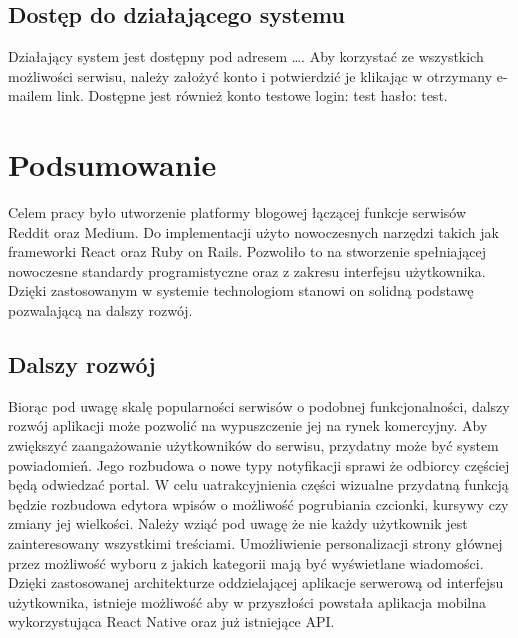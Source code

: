 \documentclass[declaration,shortabstract]{iithesis}
\begin{document}
\section{Dostęp do działającego systemu}
Działający system jest dostępny pod adresem \ldots. Aby korzystać ze wszystkich możliwości serwisu, należy założyć konto i potwierdzić je klikając w otrzymany e-mailem link. Dostępne jest również konto testowe login: test hasło: test.
{\color{red}
\chapter{Podsumowanie}
Celem pracy było utworzenie platformy blogowej łączącej funkcje serwisów Reddit oraz Medium. Do implementacji użyto nowoczesnych narzędzi takich jak frameworki React oraz Ruby on Rails. Pozwoliło to na stworzenie spełniającej nowoczesne standardy programistyczne oraz z zakresu interfejsu użytkownika. Dzięki zastosowanym w systemie technologiom stanowi on solidną podstawę pozwalającą na dalszy rozwój. 

\section{Dalszy rozwój}

Biorąc pod uwagę skalę popularności serwisów o podobnej funkcjonalności, dalszy rozwój aplikacji może pozwolić na wypuszczenie jej na rynek komercyjny. Aby zwiększyć zaangażowanie użytkowników do serwisu, przydatny może być system powiadomień. Jego rozbudowa o nowe typy notyfikacji sprawi że odbiorcy częściej będą odwiedzać portal. W celu uatrakcyjnienia części wizualne przydatną funkcją będzie rozbudowa edytora wpisów o możliwość pogrubiania czcionki, kursywy czy zmiany jej wielkości. Należy wziąć pod uwagę że nie każdy użytkownik jest zainteresowany wszystkimi treściami. Umożliwienie personalizacji strony głównej przez możliwość wyboru z jakich kategorii mają być wyświetlane wiadomości. Dzięki zastosowanej architekturze oddzielającej aplikacje serwerową od interfejsu użytkownika, istnieje możliwość aby w przyszłości powstała aplikacja mobilna wykorzystująca React Native oraz już istniejące API.


}



\end{document}
